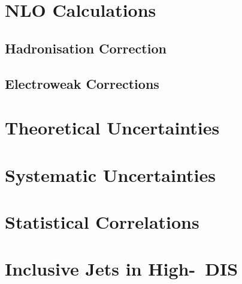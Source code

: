 \section{NLO Calculations}
\label{sec:nlopredictions}


\subsection{Hadronisation Correction}

% 
\subsection{Electroweak Corrections}


\section{Theoretical Uncertainties}
\label{sec:nlouncertainty}


\section{Systematic Uncertainties}
\label{subsec:systunc}


\section{Statistical Correlations}
\label{subsec:statcorel}


\section{Inclusive Jets in High-\qsq~DIS}
\label{sec:incljetsncdis}

